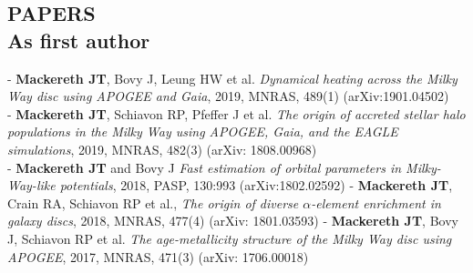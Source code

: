 \documentclass[margin]{res}
\begin{document}
\begin{resume}
\section{PAPERS\\ As first author}
\par
- \textbf{Mackereth JT}, Bovy J, Leung HW et al. \emph{Dynamical heating across the Milky Way disc using APOGEE and Gaia}, 2019, MNRAS, 489(1) (arXiv:1901.04502) \\
- \textbf{Mackereth JT}, Schiavon RP, Pfeffer J et al. \emph{The origin of accreted stellar halo populations in the Milky Way using APOGEE, Gaia, and the EAGLE simulations}, 2019, MNRAS, 482(3) (arXiv: 1808.00968) \\
- \textbf{Mackereth JT} and Bovy J \emph{Fast estimation of orbital parameters in Milky-Way-like potentials}, 2018, PASP, 130:993 (arXiv:1802.02592)
\newline - \textbf{Mackereth JT}, Crain RA, Schiavon RP et al., \emph{The origin of diverse $\alpha$-element enrichment in galaxy discs}, 2018, MNRAS, 477(4) (arXiv: 1801.03593) 
\newline - \textbf{Mackereth JT}, Bovy J, Schiavon RP et al. \emph{The age-metallicity structure of the Milky Way disc using APOGEE}, 2017, MNRAS, 471(3) (arXiv: 1706.00018)


\end{resume}
\end{document}
